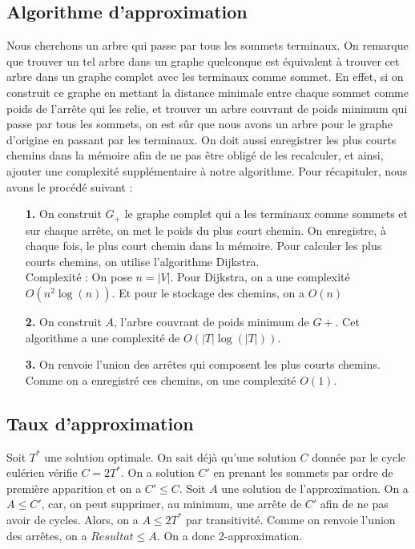 \documentclass[11pt,french]{report}
\begin{document}
	\subsection{Algorithme d'approximation\label{Algo approx}}
	Nous cherchons un arbre qui passe par tous les sommets terminaux. On remarque que trouver un tel arbre dans un graphe quelconque est équivalent à trouver cet arbre dans un graphe complet avec les terminaux comme sommet. En effet, si on construit ce graphe en mettant la distance minimale entre chaque sommet comme poids de l'arrête qui les relie, et trouver un arbre couvrant de poids minimum qui passe par tous les sommets, on est sûr que nous avons un arbre pour le graphe d'origine en passant par les terminaux. On doit aussi enregistrer les plus courts chemins dans la mémoire afin de ne pas être obligé de les recalculer, et ainsi, ajouter une complexité supplémentaire à notre algorithme. Pour récapituler, nous avons le procédé suivant : 
	\begin{itemize}
		\item[\textbf{1.}] On construit $G_+$ le graphe complet qui a les terminaux comme sommets et sur chaque arrête, on met le poids du plus court chemin. On enregistre, à chaque fois, le plus court chemin dans la mémoire. Pour calculer les plus courts chemins, on utilise l'algorithme Dijkstra.\\
		Complexité : On pose $n=|V|$. Pour Dijkstra, on a une complexité $O(n^2\log(n))$. Et pour le stockage des chemins, on a $O(n)$
		\\
		\item[\textbf{2.}] On construit $A$, l'arbre couvrant de poids minimum de $G+$. Cet algorithme a une complexité de $O(|T|\log(|T|))$.
		\\
		\item[\textbf{3.}] On renvoie l'union des arrêtes qui composent les plus courts chemins. Comme on a enregistré ces chemins, on une complexité $O(1)$.
	\end{itemize}
	
	\subsection{Taux d'approximation\label{taux}} 
	Soit $T^*$ une solution optimale. On sait déjà qu'une solution $C$ donnée par le cycle eulérien vérifie $C=2T^*$. On a solution $C'$ en prenant les sommets par ordre de première apparition et on a $C'\leq C$. Soit $A$ une solution de l'approximation. On a $A\leq C'$, car, on peut supprimer, au minimum, une arrête de $C'$ afin de ne pas avoir de cycles. Alors, on a $A\leq 2T^*$ par transitivité. Comme on renvoie l'union des arrêtes, on a $Resultat\leq A$. On a donc 2-approximation.
	
\end{document}
